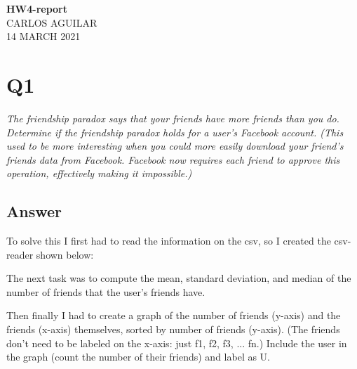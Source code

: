 \documentclass[12pt]{article}
\begin{document}
\begin{centering}
{\large\textbf{HW4-report}}\\ %
CARLOS AGUILAR\\                     %
14 MARCH 2021\\                      %
\end{centering}


\section*{Q1}
\emph{
The friendship paradox says that your friends have more friends than you do. Determine if the friendship paradox holds for a user's Facebook account. (This used to be more interesting when you could more easily download your friend's friends data from Facebook. Facebook now requires each friend to approve this operation, effectively making it impossible.)}

\subsection*{Answer}
To solve this I first had to read the information on the csv, so I created the csv-reader shown below:


The next task was to compute the mean, standard deviation, and median of the number of friends that the user's friends have.


Then finally I had to create a graph of the number of friends (y-axis) and the friends (x-axis) themselves, sorted by number of friends (y-axis). (The friends don't need to be labeled on the x-axis: just f1, f2, f3, ... fn.) Include the user in the graph (count the number of their friends) and label as U.

\end{document}

